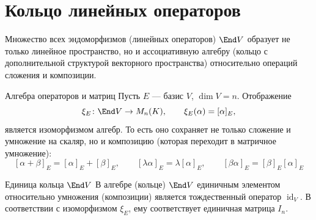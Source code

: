 
\section{Кольцо линейных операторов}

Множество всех эндоморфизмов (линейных операторов) $\End V$ образует не только линейное пространство, но и ассоциативную алгебру (кольцо с дополнительной структурой векторного пространства) относительно операций сложения и композиции.

\begin{Proposition}{Алгебра операторов и матриц}{}
	Пусть $E$ --- базис $V$, $\dim V=n$. Отображение
	\[
	\xi_E\colon \End V\to M_n(K), \qquad \xi_E(\alpha)=[\alpha]_E,
	\]
	является изоморфизмом алгебр.
	То есть оно сохраняет не только сложение и умножение на скаляр, но и композицию (которая переходит в матричное умножение):
	\[
	[\alpha+\beta]_E=[\alpha]_E+[\beta]_E, \qquad [\lambda\alpha]_E=\lambda[\alpha]_E, \qquad [\beta\alpha]_E=[\beta]_E[\alpha]_E
	\]
\end{Proposition}

\begin{Remark}{Единица кольца $\End V$}{}
	В алгебре (кольце) $\End V$ единичным элементом относительно умножения (композиции) является тождественный оператор $\operatorname{id}_V$. В соответствии с изоморфизмом $\xi_E$, ему соответствует единичная матрица $I_n$.
\end{Remark}
